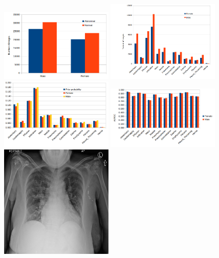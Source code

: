 \documentclass[12pt,oneside,a4paper]{report}
\begin{document}
\begin{figure}[H]
  \centering
  \includegraphics[width=0.48\textwidth]{images/charts/gender_basic}\hspace{0.01\textwidth}%
  \includegraphics[width=0.48\textwidth]{images/charts/gender_detailed}\\[0.01\textwidth]
  \includegraphics[width=0.48\textwidth]{images/charts/gender_probs}\hspace{0.01\textwidth}%
  \includegraphics[width=0.48\textwidth]{images/charts/gender_auc}\\[0.01\textwidth]
  \includegraphics[width=0.48\textwidth]{images/gender_cropped_orig}\hspace{0.01\textwidth}%

\end{figure}
\end{document}
